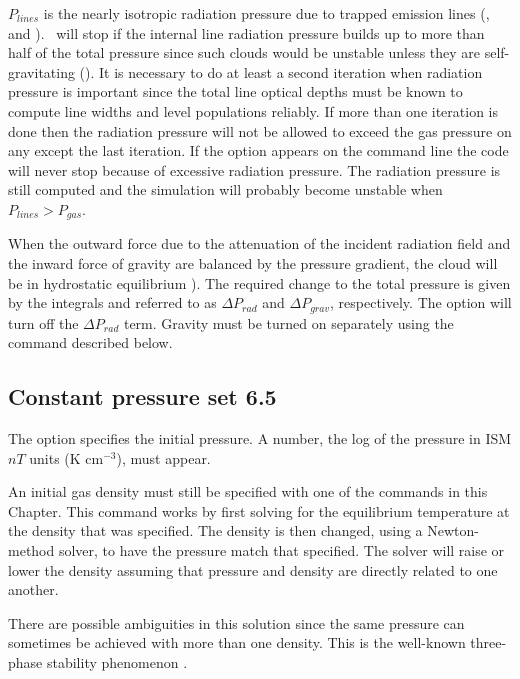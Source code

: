 $P_{lines}$ is the nearly isotropic radiation pressure due to
trapped emission
lines (\citealp{FerlandElitzur1984}, and \citealp{Elitzur1986}).
\Cloudy\ will
stop if the internal line radiation pressure builds up to more than half
of the total pressure since such clouds would be unstable unless they are
self-gravitating (\citealp{Elitzur1986}).
It is necessary to do at least
a second iteration when radiation pressure is important since the total
line optical depths must be known to compute line widths and level
populations reliably.
If more than one iteration is done then the radiation
pressure will not be allowed to exceed the gas pressure on any except the
last iteration.
If the option  appears on the command line the
code will never stop because of excessive radiation pressure.
The radiation
pressure is still computed and the simulation will probably become
unstable when $P_{lines} > P_{gas}$.

When the outward force due to the attenuation of the incident
radiation field and the inward force of gravity are balanced by
the pressure gradient, the cloud will be in hydrostatic equilibrium
\citealp{AscasibarDiaz2009}).
The required change to the total pressure is given by the integrals
and referred to as $\Delta P_{rad}$ and $\Delta P_{grav}$, respectively.
The  option will turn off the $\Delta P_{rad}$ term.
Gravity must be turned on separately using the  command
described below.

\subsection{Constant pressure set 6.5}

The  option specifies the initial pressure.
A number, the log of
the pressure in ISM $nT$ units (K cm$^{-3}$), must appear.

An initial gas density must still be specified with one of the commands
in this Chapter.  This command works by first solving for the equilibrium
temperature at the density that was specified.
The density is then changed,
using a Newton-method solver, to have the pressure match that specified.
The solver will raise or lower the density assuming that pressure and
density are directly related to one another.

There are possible ambiguities in this solution since the same pressure
can sometimes be achieved with more than one density.
This is the well-known
three-phase stability phenomenon \citep{Field1969}.


